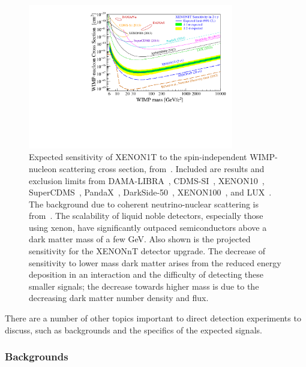 \begin{figure}[htb]
    \centering
    \includegraphics[width=0.8\textwidth]{figures/dm/limit_plot}
    \caption{Expected sensitivity of XENON1T to the spin-independent WIMP-nucleon scattering cross section, from~\cite{Aprile:2015uzo}. Included are results and exclusion limits from DAMA-LIBRA~\cite{Savage:2008er}, CDMS-SI~\cite{Agnese:2013rvf}, XENON10~\cite{Angle:2013}, SuperCDMS~\cite{Agnese:2014aze}, PandaX~\cite{Xiao:2014}, DarkSide-50~\cite{Agnes:2015ftt}, XENON100~\cite{Aprile:2012nq}, and LUX~\cite{Akerib:2015rjg}. The background due to coherent neutrino-nuclear scattering is from~\cite{Billard:2013qya}. The scalability of liquid noble detectors, especially those using xenon, have significantly outpaced semiconductors above a dark matter mass of a few GeV. Also shown is the projected sensitivity for the XENONnT detector upgrade. The decrease of sensitivity to lower mass dark matter arises from the reduced energy deposition in an interaction and the difficulty of detecting these smaller signals; the decrease towards higher mass is due to the decreasing dark matter number density and flux.}\label{fig:limits}
\end{figure}

There are a number of other topics important to direct detection experiments to discuss, such as backgrounds and the specifics of the expected signals.

\subsubsection{Backgrounds}

